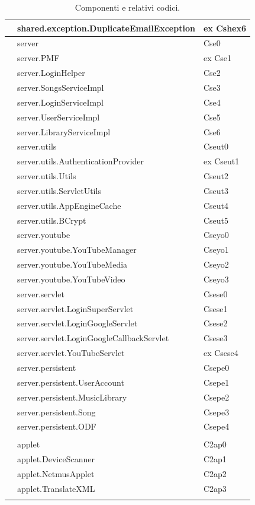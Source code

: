 \begin{footnotesize}
\begin{longtable}[h]{|l|l|l|}
\bo{--} & shared.exception.DuplicateEmailException  &  ex Cshex6 \\\hline 
& server  &  Cse0 \\\hline 
\bo{--} & server.PMF  &  ex Cse1 \\\hline 
& server.LoginHelper  &  Cse2 \\\hline 
& server.SongsServiceImpl  &  Cse3 \\\hline 
& server.LoginServiceImpl  &  Cse4 \\\hline 
& server.UserServiceImpl  &  Cse5 \\\hline 
& server.LibraryServiceImpl  &  Cse6 \\\hline 
& server.utils  &  Cseut0 \\\hline 
\bo{--} & server.utils.AuthenticationProvider  &  ex Cseut1 \\\hline 
& server.utils.Utils  &  Cseut2 \\\hline 
& server.utils.ServletUtils  &  Cseut3 \\\hline  
\bo{+} & server.utils.AppEngineCache  &  Cseut4 \\\hline
\bo{+} & server.utils.BCrypt  &  Cseut5 \\\hline
\bo{+} & server.youtube  &  Cseyo0 \\\hline
\bo{+} & server.youtube.YouTubeManager  &  Cseyo1 \\\hline
\bo{+} & server.youtube.YouTubeMedia  &  Cseyo2 \\\hline
\bo{+} & server.youtube.YouTubeVideo  &  Cseyo3 \\\hline
& server.servlet  &  Csese0 \\\hline 
& server.servlet.LoginSuperServlet  &  Csese1 \\\hline 
& server.servlet.LoginGoogleServlet  &  Csese2 \\\hline 
& server.servlet.LoginGoogleCallbackServlet  &  Csese3 \\\hline 
\bo{--} & server.servlet.YouTubeServlet  &  ex Csese4 \\\hline 
& server.persistent  &  Csepe0 \\\hline 
& server.persistent.UserAccount  &  Csepe1 \\\hline 
& server.persistent.MusicLibrary  &  Csepe2 \\\hline 
& server.persistent.Song  &  Csepe3 \\\hline 
\bo{+} & server.persistent.ODF  &  Csepe4 \\\hline 
&&\\\hline
\bo{+} & applet  &  C2ap0 \\\hline
\bo{+} & applet.DeviceScanner  &  C2ap1 \\\hline
\bo{+} & applet.NetmusApplet  &  C2ap2 \\\hline
\bo{+} & applet.TranslateXML  &  C2ap3 \\\hline
\caption{Componenti e relativi codici.}
\centering
\end{longtable}
\end{footnotesize}


